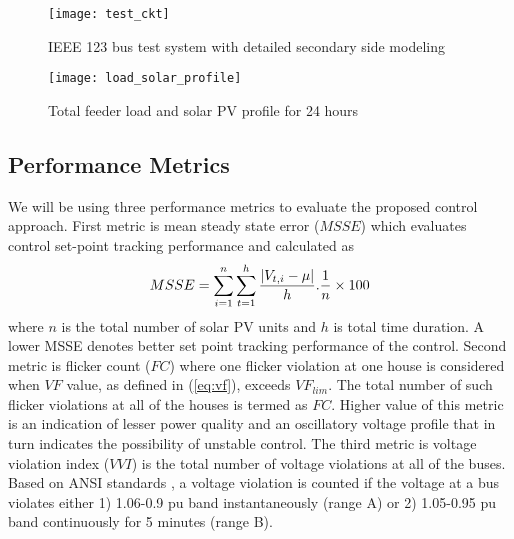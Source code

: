 \documentclass[journal]{IEEEtran}
\newcommand{\squeezeup}{\vspace{-2.5mm}}
\begin{document}
\begin{figure}
	\centering
	\texttt{[image: test\_ckt]}
    \caption {IEEE 123 bus test system with detailed secondary side modeling}
    \label{fig:test_ckt}
    \squeezeup
\end{figure}

\begin{figure}
	\centering
	\texttt{[image: load\_solar\_profile]}
    \squeezeup
    \caption {Total feeder load and solar PV profile for 24 hours}
    \label{fig:load_solar_profile}
    \squeezeup
\end{figure}
\vspace{-0.2em}

\subsection{Performance Metrics}
We will be using three performance metrics to evaluate the proposed control approach. First metric is mean steady state error ($MSSE$) which evaluates control set-point tracking performance and
calculated as
\begin{equation}
\small
\label{eq:msse}
MSSE=\sum_{i=1}^n \sum_{t=1}^h \frac{|V_{t,i}-\mu|}{h}.\frac{1}{n}\times100
\end{equation}
where $n$ is the total number of solar PV units and $h$ is total time duration. A lower MSSE denotes better set point tracking performance of the control.
Second metric is flicker count ($FC$) where one flicker violation at one house is considered when $VF$ %
value, as defined in (\ref{eq:vf}), exceeds $VF_{lim}$. %
The total number of such flicker violations at all of the houses is termed as $FC$. Higher value of this metric is an indication of lesser power quality and an oscillatory voltage profile that in turn indicates the possibility of unstable control.
The third metric is voltage violation index ($VVI$) is the total number of voltage violations at all of the buses. Based on ANSI standards \cite{noauthor_ansi_2016}, %
a voltage violation is counted if the voltage at a bus violates either 1) 1.06-0.9 pu band instantaneously (range A) or 2) 1.05-0.95 pu band continuously for 5 minutes (range B).
\end{document}

